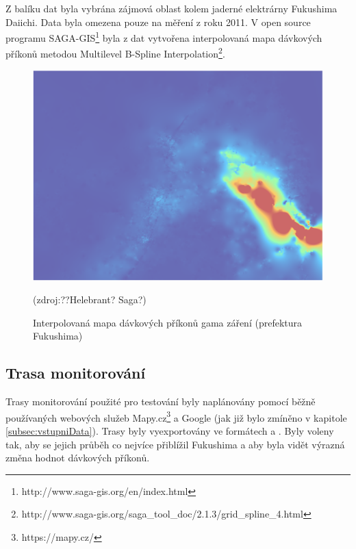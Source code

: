 Z balíku dat byla vybrána zájmová oblast kolem jaderné elektrárny Fukushima Daiichi. Data byla omezena pouze na měření z roku 2011. V open source programu SAGA-GIS\footnote{http://www.saga-gis.org/en/index.html} byla z dat vytvořena interpolovaná mapa dávkových příkonů metodou Multilevel B-Spline Interpolation\footnote{http://www.saga-gis.org/saga\_tool\_doc/2.1.3/grid\_spline\_4.html}.

\begin{figure}[H]
    \centering
    \includegraphics[scale=0.4]{./pictures/interpolovana_mapa.png}
      	\caption[Interpolovaná mapa dávkových příkonů (prefektura Fukushima)]{Interpolovaná mapa dávkových příkonů gama záření (prefektura Fukushima)}(zdroj:??Helebrant? Saga?)
    	\label{fig:interpolatedMap}
\end{figure} 

\subsection{Trasa monitorování}
Trasy monitorování použité pro testování byly naplánovány pomocí běžně používaných webových služeb Mapy.cz\footnote{https://mapy.cz/} a Google (jak již bylo zmíněno v kapitole \ref{subsec:vstupniData}). Trasy byly vyexportovány ve formátech  a . Byly voleny tak, aby se jejich průběh co nejvíce přiblížil  Fukushima a aby byla vidět výrazná změna hodnot dávkových příkonů.


